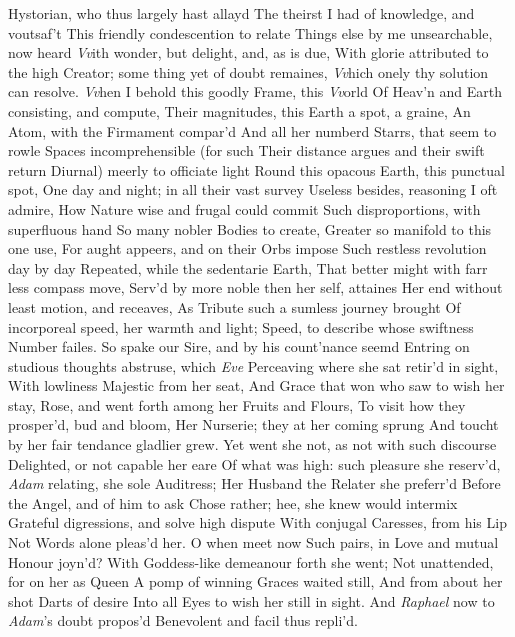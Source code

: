 \documentclass[11pt]{book}
\begin{document}
Hystorian, who thus largely hast allayd 
The theirst I had of knowledge, and voutsaf't 
This friendly condescention to relate 
Things else by me unsearchable, now heard 
\textit{Vv}ith wonder, but delight, and, as is due, 
With glorie attributed to the high 
Creator; some thing yet of doubt remaines, 
\textit{Vv}hich onely thy solution can resolve. 
\textit{Vv}hen I behold this goodly Frame, this \textit{Vv}orld 
Of Heav'n and Earth consisting, and compute, 
Their magnitudes, this Earth a spot, a graine, 
An Atom, with the Firmament compar'd 
And all her numberd Starrs, that seem to rowle 
Spaces incomprehensible (for such 
Their distance argues and their swift return 
Diurnal) meerly to officiate light 
Round this opacous Earth, this punctual spot, 
One day and night; in all their vast survey 
Useless besides, reasoning I oft admire, 
How Nature wise and frugal could commit 
Such disproportions, with superfluous hand 
So many nobler Bodies to create, 
Greater so manifold to this one use, 
For aught appeers, and on their Orbs impose 
Such restless revolution day by day 
Repeated, while the sedentarie Earth, 
That better might with farr less compass move, 
Serv'd by more noble then her self, attaines 
Her end without least motion, and receaves, 
As Tribute such a sumless journey brought 
Of incorporeal speed, her warmth and light; 
Speed, to describe whose swiftness Number failes. 
\quad So spake our Sire, and by his count'nance seemd 
Entring on studious thoughts abstruse, which \textit{Eve} 
Perceaving where she sat retir'd in sight, 
With lowliness Majestic from her seat, 
And Grace that won who saw to wish her stay, 
Rose, and went forth among her Fruits and Flours, 
To visit how they prosper'd, bud and bloom, 
Her Nurserie; they at her coming sprung 
And toucht by her fair tendance gladlier grew. 
Yet went she not, as not with such discourse 
Delighted, or not capable her eare 
Of what was high: such pleasure she reserv'd, 
\textit{Adam} relating, she sole Auditress; 
Her Husband the Relater she preferr'd 
Before the Angel, and of him to ask 
Chose rather; hee, she knew would intermix 
Grateful digressions, and solve high dispute 
With conjugal Caresses, from his Lip 
Not Words alone pleas'd her.  O when meet now 
Such pairs, in Love and mutual Honour joyn'd? 
With Goddess-like demeanour forth she went; 
Not unattended, for on her as Queen 
A pomp of winning Graces waited still, 
And from about her shot Darts of desire 
Into all Eyes to wish her still in sight. 
And \textit{Raphael} now to \textit{Adam}'s doubt propos'd 
Benevolent and facil thus repli'd. 
\end{document}
